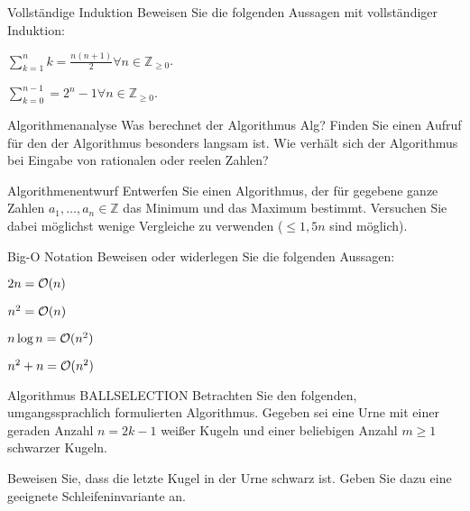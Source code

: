 \documentclass{exercisesheet}
\author{Leopold Lemmermann}
\begin{document}
\createtitle

\begin{eexercises}{Vollständige Induktion}{
    Beweisen Sie die folgenden Aussagen mit vollständiger Induktion:
  }
  \item $\sum_{k=1}^{n}{k} = \frac{n(n+1)}{2}\forall n \in \mathbb{Z}_{\geq 0}$.
  \item $\sum_{k=0}^{n-1} = 2^n-1\forall n \in \mathbb{Z}_{\geq 0}$.
\end{eexercises}

\begin{exercise}{Algorithmenanalyse}
  Was berechnet der Algorithmus Alg? Finden Sie einen Aufruf für den der Algorithmus besonders langsam ist. Wie verhält sich der Algorithmus bei Eingabe von rationalen oder reelen Zahlen?
  \begin{algorithm}[ht]
    \caption{Alg}
  \end{algorithm}
\end{exercise}

\begin{exercise}{Algorithmenentwurf}
  Entwerfen Sie einen Algorithmus, der für gegebene ganze Zahlen $a_1, \ldots, a_n \in \mathbb{Z}$ das Minimum und das Maximum bestimmt. Versuchen Sie dabei möglichst wenige Vergleiche zu verwenden ($\leq 1,5n$ sind möglich).
\end{exercise}



\begin{eexercises}{Big-O Notation}{
    Beweisen oder widerlegen Sie die folgenden Aussagen:}
  \item $2n = \mathcal{O}(n)$
  \item $n^2 = \mathcal{O}(n)$
  \item $n \log n = \mathcal{O}(n^2)$
  \item $n^2 + n = \mathcal{O}(n^2)$
\end{eexercises}

\begin{exercise}{Algorithmus BALLSELECTION}
  Betrachten Sie den folgenden, umgangssprachlich formulierten Algorithmus. Gegeben sei eine Urne mit einer geraden Anzahl $n = 2k - 1$ weißer Kugeln und einer beliebigen Anzahl $m \geq 1$ schwarzer Kugeln.\par
  \begin{algorithm}[ht]
    \caption{BALLSELECTION}
  \end{algorithm}
  \noindent Beweisen Sie, dass die letzte Kugel in der Urne schwarz ist. Geben Sie dazu eine geeignete Schleifeninvariante an.
\end{exercise}
\end{document}
